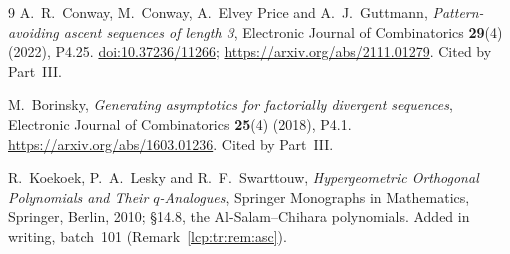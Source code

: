 \documentclass[11pt]{article}
\numberwithin{equation}{section}
\theoremstyle{definition}\newtheorem{definition}[theorem]{Definition}
\theoremstyle{remark}\newtheorem{remark}[theorem]{Remark}
\begin{document}
\begin{thebibliography}{9}
A.~R.~Conway, M.~Conway, A.~Elvey Price and A.~J.~Guttmann,
\emph{Pattern-avoiding ascent sequences of length 3}, Electronic Journal of
Combinatorics \textbf{29}(4) (2022), P4.25.
\href{https://doi.org/10.37236/11266}{doi:10.37236/11266};
\url{https://arxiv.org/abs/2111.01279}. Cited by Part~III.

M.~Borinsky, \emph{Generating asymptotics for factorially divergent
sequences}, Electronic Journal of Combinatorics \textbf{25}(4) (2018),
P4.1. \url{https://arxiv.org/abs/1603.01236}. Cited by Part~III.

R.~Koekoek, P.~A.~Lesky and R.~F.~Swarttouw, \emph{Hypergeometric
Orthogonal Polynomials and Their $q$-Analogues}, Springer Monographs in
Mathematics, Springer, Berlin, 2010; \S14.8, the Al-Salam--Chihara
polynomials. Added in writing, batch~101 (Remark~\ref{lcp:tr:rem:asc}).
\end{thebibliography}
\endgroup
\end{document}
